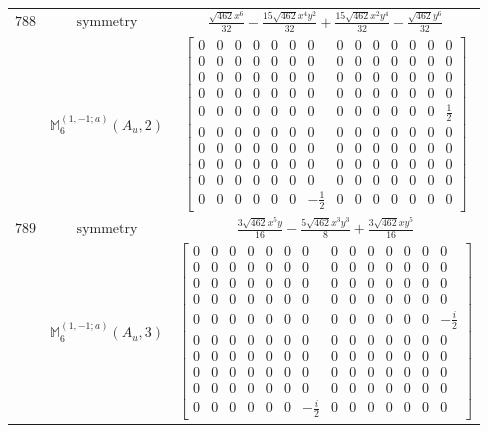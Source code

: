 \documentclass[fleqn,8pt,landscape]{jsarticle}
\begin{document}
\begin{longtable}{ccc}
$ 788 $ & $ \text{symmetry} $ & $ \frac{\sqrt{462} x^{6}}{32} - \frac{15 \sqrt{462} x^{4} y^{2}}{32} + \frac{15 \sqrt{462} x^{2} y^{4}}{32} - \frac{\sqrt{462} y^{6}}{32} $ \\
$  $ & $ \mathbb{M}_{6}^{(1,-1;a)}(A_{u},2) $ & $ \begin{bmatrix} 0 & 0 & 0 & 0 & 0 & 0 & 0 & 0 & 0 & 0 & 0 & 0 & 0 & 0 \\ 0 & 0 & 0 & 0 & 0 & 0 & 0 & 0 & 0 & 0 & 0 & 0 & 0 & 0 \\ 0 & 0 & 0 & 0 & 0 & 0 & 0 & 0 & 0 & 0 & 0 & 0 & 0 & 0 \\ 0 & 0 & 0 & 0 & 0 & 0 & 0 & 0 & 0 & 0 & 0 & 0 & 0 & 0 \\ 0 & 0 & 0 & 0 & 0 & 0 & 0 & 0 & 0 & 0 & 0 & 0 & 0 & \frac{1}{2} \\ 0 & 0 & 0 & 0 & 0 & 0 & 0 & 0 & 0 & 0 & 0 & 0 & 0 & 0 \\ 0 & 0 & 0 & 0 & 0 & 0 & 0 & 0 & 0 & 0 & 0 & 0 & 0 & 0 \\ 0 & 0 & 0 & 0 & 0 & 0 & 0 & 0 & 0 & 0 & 0 & 0 & 0 & 0 \\ 0 & 0 & 0 & 0 & 0 & 0 & 0 & 0 & 0 & 0 & 0 & 0 & 0 & 0 \\ 0 & 0 & 0 & 0 & 0 & 0 & - \frac{1}{2} & 0 & 0 & 0 & 0 & 0 & 0 & 0 \end{bmatrix} $ \\ \hline
$ 789 $ & $ \text{symmetry} $ & $ \frac{3 \sqrt{462} x^{5} y}{16} - \frac{5 \sqrt{462} x^{3} y^{3}}{8} + \frac{3 \sqrt{462} x y^{5}}{16} $ \\
$  $ & $ \mathbb{M}_{6}^{(1,-1;a)}(A_{u},3) $ & $ \begin{bmatrix} 0 & 0 & 0 & 0 & 0 & 0 & 0 & 0 & 0 & 0 & 0 & 0 & 0 & 0 \\ 0 & 0 & 0 & 0 & 0 & 0 & 0 & 0 & 0 & 0 & 0 & 0 & 0 & 0 \\ 0 & 0 & 0 & 0 & 0 & 0 & 0 & 0 & 0 & 0 & 0 & 0 & 0 & 0 \\ 0 & 0 & 0 & 0 & 0 & 0 & 0 & 0 & 0 & 0 & 0 & 0 & 0 & 0 \\ 0 & 0 & 0 & 0 & 0 & 0 & 0 & 0 & 0 & 0 & 0 & 0 & 0 & - \frac{i}{2} \\ 0 & 0 & 0 & 0 & 0 & 0 & 0 & 0 & 0 & 0 & 0 & 0 & 0 & 0 \\ 0 & 0 & 0 & 0 & 0 & 0 & 0 & 0 & 0 & 0 & 0 & 0 & 0 & 0 \\ 0 & 0 & 0 & 0 & 0 & 0 & 0 & 0 & 0 & 0 & 0 & 0 & 0 & 0 \\ 0 & 0 & 0 & 0 & 0 & 0 & 0 & 0 & 0 & 0 & 0 & 0 & 0 & 0 \\ 0 & 0 & 0 & 0 & 0 & 0 & - \frac{i}{2} & 0 & 0 & 0 & 0 & 0 & 0 & 0 \end{bmatrix} $ \\ \hline

\end{longtable}
\end{document}
